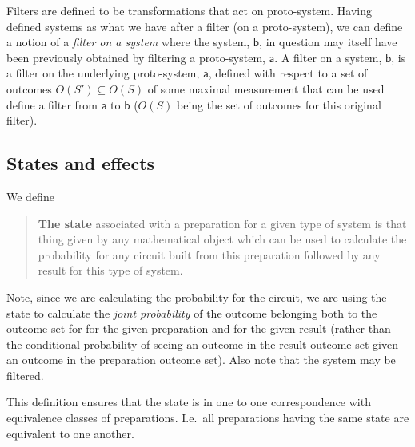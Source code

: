 \documentclass[10pt]{article}
\begin{document}
Filters are defined to be transformations that act on proto-system.  Having defined systems as what we have after a filter (on a proto-system), we can define a notion of a \emph{filter on a system}  where the system, $\mathsf b$, in question may itself have been previously obtained by filtering a proto-system, $\mathsf a$.  A filter on a system, $\mathsf b$, is a filter on the underlying proto-system, $\mathsf a$,  defined with respect to a set of outcomes $O(S') \subseteq O(S)$ of some maximal measurement that can be used define a filter from $\mathsf a$ to $\mathsf b$ ($O(S)$ being the set of outcomes for this original filter).


\subsection{States and effects}\label{associatingstateswithpreparations}



We define
\begin{quote}
{\bf The state} associated with a preparation for a given type of system is that thing given by any mathematical object which can be used to calculate the probability for any circuit built from this preparation followed by any result for this type of system.
\end{quote}
Note, since we are calculating the probability for the circuit,  we are using the state to calculate the \emph{joint probability} of the outcome belonging both to the outcome set for for the given preparation and for the given result (rather than the conditional probability of seeing an outcome in the result outcome set given an outcome in the preparation outcome set). Also note that the system may be filtered.

This definition ensures that the state is in one to one correspondence with equivalence classes of preparations. I.e.\ all preparations having the same state are equivalent to one another.
\end{document}
